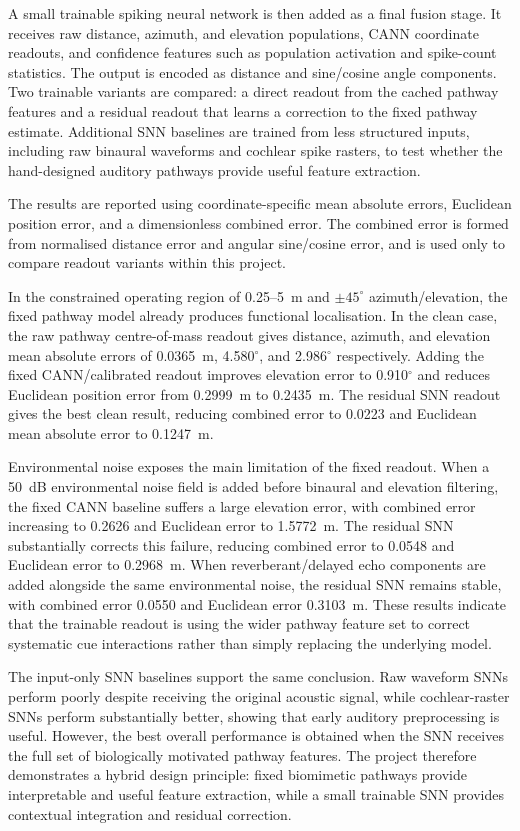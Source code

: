 A small trainable spiking neural network is then added as a final fusion stage. It receives raw distance, azimuth, and elevation populations, CANN coordinate readouts, and confidence features such as population activation and spike-count statistics. The output is encoded as distance and sine/cosine angle components. Two trainable variants are compared: a direct readout from the cached pathway features and a residual readout that learns a correction to the fixed pathway estimate. Additional SNN baselines are trained from less structured inputs, including raw binaural waveforms and cochlear spike rasters, to test whether the hand-designed auditory pathways provide useful feature extraction.

The results are reported using coordinate-specific mean absolute errors, Euclidean position error, and a dimensionless combined error. The combined error is formed from normalised distance error and angular sine/cosine error, and is used only to compare readout variants within this project.

In the constrained operating region of 0.25--5~m and $\pm45^\circ$ azimuth/elevation, the fixed pathway model already produces functional localisation. In the clean case, the raw pathway centre-of-mass readout gives distance, azimuth, and elevation mean absolute errors of 0.0365~m, 4.580$^\circ$, and 2.986$^\circ$ respectively. Adding the fixed CANN/calibrated readout improves elevation error to 0.910$^\circ$ and reduces Euclidean position error from 0.2999~m to 0.2435~m. The residual SNN readout gives the best clean result, reducing combined error to 0.0223 and Euclidean mean absolute error to 0.1247~m.

Environmental noise exposes the main limitation of the fixed readout. When a 50~dB environmental noise field is added before binaural and elevation filtering, the fixed CANN baseline suffers a large elevation error, with combined error increasing to 0.2626 and Euclidean error to 1.5772~m. The residual SNN substantially corrects this failure, reducing combined error to 0.0548 and Euclidean error to 0.2968~m. When reverberant/delayed echo components are added alongside the same environmental noise, the residual SNN remains stable, with combined error 0.0550 and Euclidean error 0.3103~m. These results indicate that the trainable readout is using the wider pathway feature set to correct systematic cue interactions rather than simply replacing the underlying model.

The input-only SNN baselines support the same conclusion. Raw waveform SNNs perform poorly despite receiving the original acoustic signal, while cochlear-raster SNNs perform substantially better, showing that early auditory preprocessing is useful. However, the best overall performance is obtained when the SNN receives the full set of biologically motivated pathway features. The project therefore demonstrates a hybrid design principle: fixed biomimetic pathways provide interpretable and useful feature extraction, while a small trainable SNN provides contextual integration and residual correction.

